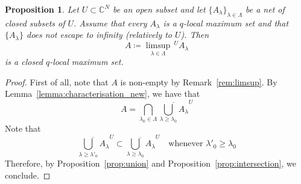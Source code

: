 \documentclass[reqno,oneside]{amsart}
\newcommand{\numberset}{\mathbb}
\newcommand{\C}{\numberset{C}}
\theoremstyle{definition}
\theoremstyle{plain}
\newtheorem{proposition}[definition]{Proposition}
\theoremstyle{remark}
\begin{document}
\begin{proposition}
\label{prop:limsup1}
	Let $U\subset\C^N$ be an open subset and let $\{A_\lambda\}_{\lambda\in\Lambda}$ be a net of closed subsets of $U$. Assume that every $A_\lambda$ is a $q$-local maximum set and that $\{A_\lambda\}$ does not escape to infinity (relatively to $U$). Then
	\[
		A\coloneqq\limsup_{\lambda\in\Lambda}\,\!\!^U A_\lambda
	\]
	is a closed $q$-local maximum set.
\end{proposition}
\begin{proof}
	First of all, note that $A$ is non-empty by Remark~\ref{rem:limsup}. By Lemma~\ref{lemma:characterisation_new}, we have that
	\[
		A=\bigcap_{\lambda_0\in\Lambda}\overline{\bigcup_{\lambda\geq\lambda_0} A_\lambda}^U
	\]
	Note that
	\[
		\overline{\bigcup_{\lambda\geq\lambda'_0} A_\lambda}^U\subset\overline{\bigcup_{\lambda\geq\lambda_0} A_\lambda}^U \quad \text{whenever }\lambda'_0\geq\lambda_0
	\]
	Therefore, by Proposition~\ref{prop:union} and Proposition~\ref{prop:intersection}, we conclude.
\end{proof}
\end{document}
